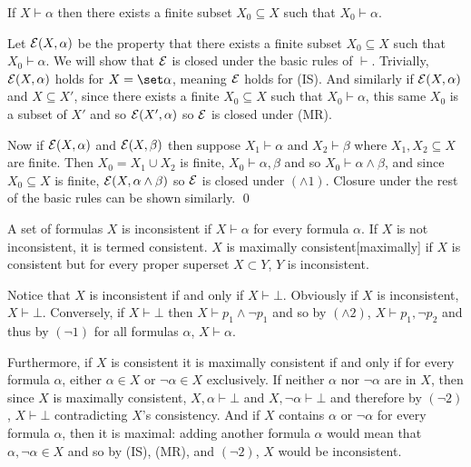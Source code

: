 \bthrm[name=vdashfinite]

    If $X\vdash\alpha$ then there exists a finite subset $X_0\subseteq X$ such that $X_0\vdash\alpha$.

\ethrm

Let ${\cal E}(X,\alpha)$ be the property that there exists a finite subset $X_0\subseteq X$ such that $X_0\vdash\alpha$.
We will show that ${\cal E}$ is closed under the basic rules of $\vdash$.
Trivially, ${\cal E}(X,\alpha)$ holds for $X=\set\alpha$, meaning ${\cal E}$ holds for (IS).
And similarly if ${\cal E}(X,\alpha)$ and $X\subseteq X'$, since there exists a finite $X_0\subseteq X$ such that $X_0\vdash\alpha$, this same $X_0$ is a subset of $X'$ and so ${\cal E}(X',\alpha)$ so
${\cal E}$ is closed under (MR).

Now if ${\cal E}(X,\alpha)$ and ${\cal E}(X,\beta)$ then suppose $X_1\vdash\alpha$ and $X_2\vdash\beta$ where $X_1,X_2\subseteq X$ are finite.
Then $X_0=X_1\cup X_2$ is finite, $X_0\vdash\alpha,\beta$ and so $X_0\vdash\alpha\land\beta$, and since $X_0\subseteq X$ is finite, ${\cal E}(X,\alpha\land\beta)$ so ${\cal E}$ is closed under $(\land1)$.
Closure under the rest of the basic rules can be shown similarly.
\qed

\bdefn

    A set of formulas $X$ is {\emphcolor inconsistent} if $X\vdash\alpha$ for every formula $\alpha$.
    If $X$ is not inconsistent, it is termed {\emphcolor consistent}.
    $X$ is {\emphcolor maximally consistent}[maximally] if $X$ is consistent but for every proper superset $X\subset Y$, $Y$ is inconsistent.

\edefn

Notice that $X$ is inconsistent if and only if $X\vdash\bot$.
Obviously if $X$ is inconsistent, $X\vdash\bot$.
Conversely, if $X\vdash\bot$ then $X\vdash p_1\land\neg p_1$ and so by $(\land2)$, $X\vdash p_1,\neg p_2$ and thus by $(\neg1)$ for all formulas $\alpha$, $X\vdash\alpha$.

Furthermore, if $X$ is consistent it is maximally consistent if and only if for every formula $\alpha$, either $\alpha\in X$ or $\neg\alpha\in X$ exclusively.
If neither $\alpha$ nor $\neg\alpha$ are in $X$, then since $X$ is maximally consistent, $X,\alpha\vdash\bot$ and $X,\neg\alpha\vdash\bot$ and therefore by $(\neg2)$, $X\vdash\bot$ contradicting $X$'s
consistency.
And if $X$ contains $\alpha$ or $\neg\alpha$ for every formula $\alpha$, then it is maximal: adding another formula $\alpha$ would mean that $\alpha,\neg\alpha\in X$ and so by (IS), (MR), and $(\neg2)$, $X$
would be inconsistent.

